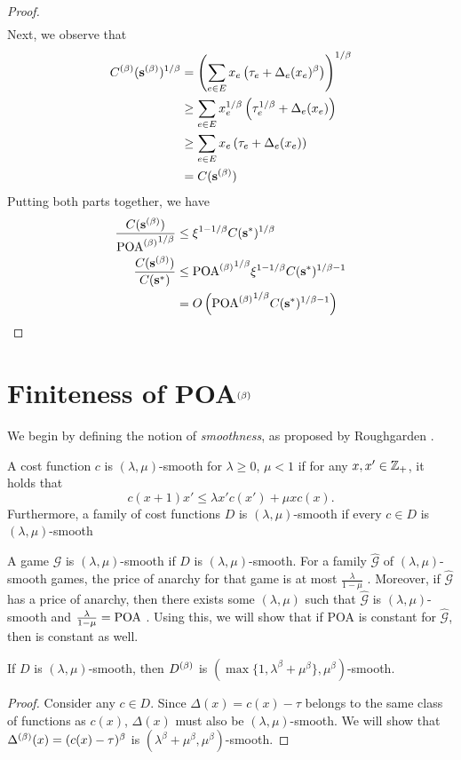 \documentclass[twoside]{article}
\begin{document}
\begin{multicols}{2}
\begin{proof}
\begin{align*}
  \end{align*}
  Next, we observe that
  \begin{align*}
    C^{(\beta)}(\mathbf{s}^{(\beta)})^{1/\beta} &= \left(\sum_{e \in E} x_e\left(\tau_e +
    \Delta_e(x_e)^\beta\right)\right)^{1/\beta} \\
    &\ge \sum_{e \in E} x_e^{1/\beta}\left(\tau_e^{1/\beta} + \Delta_e(x_e)\right) \\
    &\ge \sum_{e \in E} x_e\left(\tau_e + \Delta_e(x_e)\right) \\
    &= C(\mathbf{s}^{(\beta)})
  \end{align*}
  Putting both parts together, we have
  \begin{align*}
    \frac{C(\mathbf{s}^{(\beta)})}{{\text{POA}^{(\beta)}}^{1/\beta}} &\le \xi^{1-1/\beta} C(\mathbf{s}^*)^{1/\beta} \\
    \frac{C(\mathbf{s}^{(\beta)})}{C(\mathbf{s}^*)} &\le {\ensuremath{\text{POA}^{(\beta)}}}^{1/\beta} \xi^{1-1/\beta}
    C(\mathbf{s}^*)^{1/\beta-1} \\
    &= O\left({\text{POA}^{(\beta)}}^{1/\beta} C(\mathbf{s}^*)^{1/\beta-1}\right)
  \end{align*}
\end{proof}


\section{Finiteness of POA$^{(\beta)}$} \label{sec:ubl}
We begin by defining the notion of \textit{smoothness}, as proposed by
Roughgarden \cite{Roughgarden2012}.
\begin{defn}
  A cost function $c$ is $(\lambda,\mu)$-smooth for $\lambda \ge 0$, $\mu < 1$
  if for any $x,x' \in \mathbb{Z}_+$, it holds that
  \begin{equation}
    c(x+1) x' \le \lambda x' c(x') + \mu x c(x).
    \label{eq:lms1}
  \end{equation}
  Furthermore, a family of cost functions $D$ is $(\lambda,\mu)$-smooth if every
  $c \in D$ is $(\lambda,\mu)$-smooth
\end{defn}A game $\mathcal{G}$ is $(\lambda,\mu)$-smooth if $D$ is $(\lambda,\mu)$-smooth.
For a family $\hat{\mathcal{G}}$ of $(\lambda,\mu)$-smooth games, the price of
anarchy for that game is at most $\frac{\lambda}{1-\mu}$ \cite{Roughgarden2012}.
Moreover, if $\hat{\mathcal{G}}$ has a price of anarchy, then there exists
some $(\lambda,\mu)$ such that $\hat{\mathcal{G}}$ is $(\lambda,\mu)$-smooth and
$\frac{\lambda}{1-\mu} = \text{POA}$ \cite{Roughgarden2012}. Using this, we will show
that if POA is constant for $\hat{\mathcal{G}}$, then \poab is constant as well.

\begin{thm} \label{thm:smooth}
  If $D$ is $(\lambda,\mu)$-smooth, then $D^{(\beta)}$ is $(\max\{1,\lambda^\beta +
  \mu^\beta\},\mu^\beta)$-smooth.
\end{thm}
\begin{proof}
  Consider any $c \in D$. Since $\Delta(x) = c(x) - \tau$ belongs to the same
  class of functions as $c(x)$, $\Delta(x)$ must also be $(\lambda,\mu)$-smooth.
  We will show that $\Delta^{(\beta)}(x) = (c(x) - \tau)^\beta$ is $(\lambda^\beta +
  \mu^\beta,\mu^\beta)$-smooth.


\end{proof}
\end{multicols}
\end{document}
